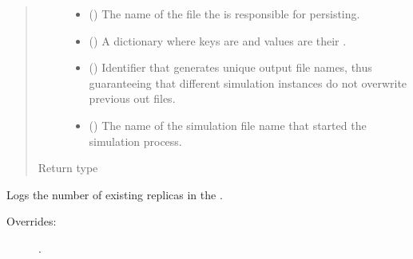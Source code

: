 \documentclass[letterpaper,10pt,english]{sphinxmanual}
\begin{document}
\begin{fulllineitems}
\begin{fulllineitems}
\begin{quote}
\begin{description}
\begin{itemize}
\item {} 
 () \textendash{} The name of the file the  is responsible for
persisting.

\item {} 
 ({\hyperref[\detokenize{app:app.type_hints.NodeDict}]{}}) \textendash{} A dictionary where keys are {\hyperref[\detokenize{app.domain:app.domain.network_nodes.Node.id}]{}} and values are their
{\hyperref[\detokenize{app.domain:app.domain.network_nodes.Node}]{}}.

\item {} 
 () \textendash{} Identifier that generates unique output file names,
thus guaranteeing that different simulation instances do not
overwrite previous out files.

\item {} 
 () \textendash{} The name of the simulation file name that started
the simulation process.

\end{itemize}

\item[{Return type}] \leavevmode
{}

\end{description}\end{quote}

\end{fulllineitems}


\begin{fulllineitems}
\label{\detokenize{app.domain:app.domain.cluster_groups.HDFSCluster.evaluate}}
Logs the number of existing replicas in the .
\begin{description}
\item[{Overrides:}] \leavevmode
{\hyperref[\detokenize{app.domain:app.domain.cluster_groups.Cluster.evaluate}]{}}.


\end{description}
\end{fulllineitems}
\end{fulllineitems}
\end{document}
